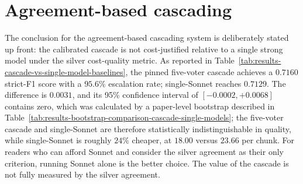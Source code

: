 \section{Agreement-based cascading}\label{section:disc-agreement-based-cascading}

The conclusion for the agreement-based cascading system is deliberately stated up front: the calibrated cascade is not cost-justified relative to a single strong model under the silver cost-quality metric. As reported in Table~\ref{tab:results-cascade-vs-single-model-baselines}, the pinned five-voter cascade achieves a $0.7160$ strict-F1 score with a $95.6\%$ escalation rate; single-Sonnet reaches $0.7129$. The difference is $0.0031$, and its 95\% confidence interval of $[-0.0002, +0.0068]$ contains zero, which was calculated by a paper-level bootstrap described in Table~\ref{tab:results-bootstrap-comparison-cascade-single-models}; the five-voter cascade and single-Sonnet are therefore statistically indistinguishable in quality, while single-Sonnet is roughly $24\%$ cheaper, at $18.00$ versus $23.66$ per chunk. For readers who can afford Sonnet and consider the silver agreement as their only criterion, running Sonnet alone is the better choice. The value of the cascade is not fully measured by the silver agreement.

